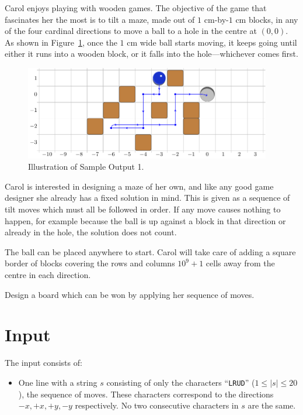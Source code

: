 
Carol enjoys playing with wooden games. The objective of the game that
fascinates her the most is to tilt a maze, made out of $1\text{ cm}$-by-$1\text{ cm}$ blocks, in
any of the four cardinal directions to move a ball to a hole in the
centre at $(0, 0)$. As shown in Figure~\ref{fig:maze}, once the $1\text{ cm}$ wide ball starts moving, it keeps
going until either it runs into a wooden block, or it falls
into the hole---whichever comes first.

\begin{figure}[h!]
  \centering
  \includegraphics[width=0.96\textwidth]{fig}
  \caption{Illustration of Sample Output 1.}
  \label{fig:maze}
\end{figure}

\vspace{-1mm}

Carol is interested in designing a maze of her own, and like any good
game designer she already has a fixed solution in mind. This is given as a
sequence of tilt moves which must all be followed in order. If any move causes
nothing to happen, for example because the ball is up against a block in that
direction or already in the hole, the solution does not count.

The ball can be placed anywhere to start. Carol will take care of adding a
square border of blocks covering the rows and columns $10^9+1$ cells away from
the centre in each direction.

Design a board which can be won by applying her sequence of moves.

\vspace{-1mm}

\section*{Input}

The input consists of:
\begin{itemize}
    \item One line with a string $s$ consisting of only the characters
          ``\texttt{LRUD}'' ($1 \le |s| \le 20$),
          the sequence of moves. These characters
          correspond to the directions $-x, +x, +y, -y$ respectively.
          No two consecutive characters in $s$ are the same.
\end{itemize}

